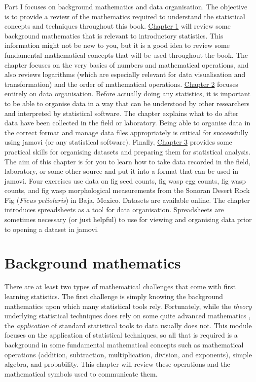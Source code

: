 \documentclass[
]{scrbook}
\begin{document}
Part I focuses on background mathematics and data organisation.
The objective is to provide a review of the mathematics required to understand the statistical concepts and techniques throughout this book.
\protect\hyperlink{Chapter_1}{Chapter 1} will review some background mathematics that is relevant to introductory statistics.
This information might not be new to you, but it is a good idea to review some fundamental mathematical concepts that will be used throughout the book.
The chapter focuses on the very basics of numbers and mathematical operations, and also reviews logarithms (which are especially relevant for data visualisation and transformation) and the order of mathematical operations.
\protect\hyperlink{Chapter_2}{Chapter 2} focuses entirely on data organisation.
Before actually doing any statistics, it is important to be able to organise data in a way that can be understood by other researchers and interpreted by statistical software.
The chapter explains what to do after data have been collected in the field or laboratory.
Being able to organise data in the correct format and manage data files appropriately is critical for successfully using jamovi (or any statistical software).
Finally, \protect\hyperlink{Chapter_3}{Chapter 3} provides some practical skills for organising datasets and preparing them for statistical analysis.
The aim of this chapter is for you to learn how to take data recorded in the field, laboratory, or some other source and put it into a format that can be used in jamovi.
Four exercises use data on fig seed counts, fig wasp egg counts, fig wasp counts, and fig wasp morphological measurements from the Sonoran Desert Rock Fig (\emph{Ficus petiolaris}) in Baja, Mexico.
Datasets are available online.
The chapter introduces spreadsheets as a tool for data organisation.
Spreadsheets are sometimes necessary (or just helpful) to use for viewing and organising data prior to opening a dataset in jamovi.

\hypertarget{Chapter_1}{%
\chapter{Background mathematics}\label{Chapter_1}}

There are at least two types of mathematical challenges that come with first learning statistics.
The first challenge is simply knowing the background mathematics upon which many statistical tools rely.
Fortunately, while the \emph{theory} underlying statistical techniques does rely on some quite advanced mathematics \citep[e.g., see][]{Mclean1991, Rencher2000, Miller2004}, the \emph{application} of standard statistical tools to data usually does not.
This module focuses on the application of statistical techniques, so all that is required is a background in some fundamental mathematical concepts such as mathematical operations (addition, subtraction, multiplication, division, and exponents), simple algebra, and probability.
This chapter will review these operations and the mathematical symbols used to communicate them.
\end{document}
